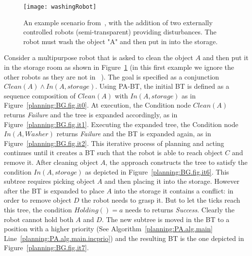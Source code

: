 \begin{figure}[h!]
    \centering
\texttt{[image: washingRobot]} %
    \caption{
    An example scenario from~\cite{kaelbling2011hierarchical},
    with the addition of two externally controlled robots (semi-transparent) providing disturbances. The robot must wash the object "A" and then put in into the storage.
    }
    \label{planning:BG.fig.youbot}
\end{figure}
\begin{example}
\label{planning:BG.ex.simple}
Consider a multipurpose robot that is asked to clean the object $A$ and then put it in the storage room as shown in Figure~\ref{planning:BG.fig.youbot} (in this first example we ignore the other robots as they are not in ~\cite{kaelbling2011hierarchical}). The goal is specified as a conjunction $Clean(A) \land In(A,storage)$. Using PA-BT, the initial BT is defined as a sequence composition of $Clean(A)$ with $In(A,storage)$ as in Figure~\ref{planning:BG.fig.it0}. At execution, the Condition node $Clean(A)$ returns \emph{Failure} and the tree is expanded accordingly, as in Figure~\ref{planning:BG.fig.it1}. Executing the expanded tree, the Condition node $In(A,Washer)$ returns \emph{Failure} and the BT is expanded again, as in Figure~\ref{planning:BG.fig.it2}. This iterative process of planning and acting continues until it creates a BT such that the robot is able to reach  object $C$ and remove it. After cleaning  object $A$, the approach constructs the tree to satisfy the condition $In(A,storage)$ as depicted in Figure~\ref{planning:BG.fig.it6}. This subtree requires  picking  object $A$ and then placing it into the storage. However after the BT is expanded to place $A$ into the storage it contains a conflict: in order to remove  object $D$ the robot needs to grasp it. But to let the ticks reach this tree, the condition $Holding()=a$ needs to returns \emph{Success}. Clearly the robot cannot hold both $A$ and $D$. The new subtree is moved in the BT to a position with a higher priority (See Algorithm~\ref{planning:PA.alg.main} Line~\ref{planning:PA.alg.main.incprio}) and the resulting BT is the one depicted in Figure~\ref{planning:BG.fig.it7}.
\end{example}
